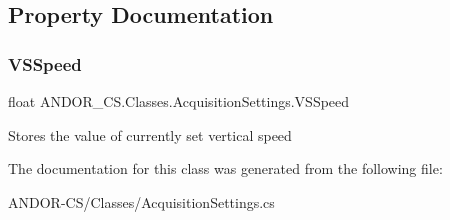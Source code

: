 \subsection{Property Documentation}
\mbox{\label{class_a_n_d_o_r___c_s_1_1_classes_1_1_acquisition_settings_a8c28fef4f4d906792f085d9f291648a1}} 
\subsubsection{\texorpdfstring{V\+S\+Speed}{VSSpeed}}
{\footnotesize\ttfamily float A\+N\+D\+O\+R\+\_\+\+C\+S.\+Classes.\+Acquisition\+Settings.\+V\+S\+Speed\hspace{0.3cm}{\ttfamily [get]}}



Stores the value of currently set vertical speed 



The documentation for this class was generated from the following file\+:\begin{DoxyCompactItemize}
\item 
A\+N\+D\+O\+R-\/\+C\+S/\+Classes/Acquisition\+Settings.\+cs\end{DoxyCompactItemize}
